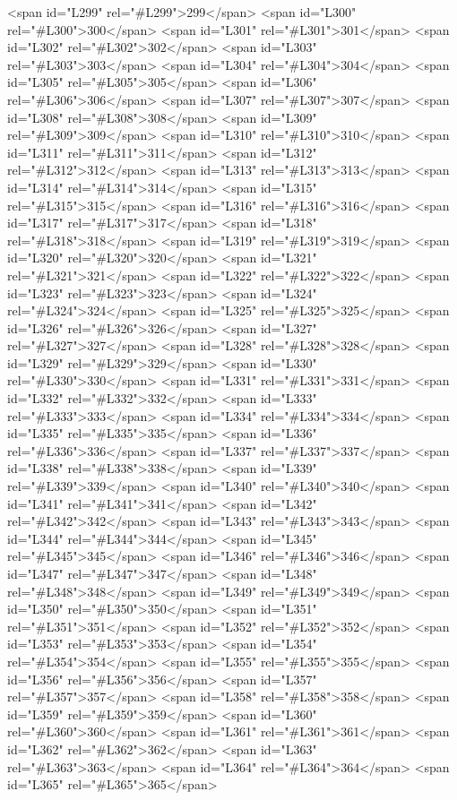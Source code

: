 <span id="L299" rel="#L299">299</span>
<span id="L300" rel="#L300">300</span>
<span id="L301" rel="#L301">301</span>
<span id="L302" rel="#L302">302</span>
<span id="L303" rel="#L303">303</span>
<span id="L304" rel="#L304">304</span>
<span id="L305" rel="#L305">305</span>
<span id="L306" rel="#L306">306</span>
<span id="L307" rel="#L307">307</span>
<span id="L308" rel="#L308">308</span>
<span id="L309" rel="#L309">309</span>
<span id="L310" rel="#L310">310</span>
<span id="L311" rel="#L311">311</span>
<span id="L312" rel="#L312">312</span>
<span id="L313" rel="#L313">313</span>
<span id="L314" rel="#L314">314</span>
<span id="L315" rel="#L315">315</span>
<span id="L316" rel="#L316">316</span>
<span id="L317" rel="#L317">317</span>
<span id="L318" rel="#L318">318</span>
<span id="L319" rel="#L319">319</span>
<span id="L320" rel="#L320">320</span>
<span id="L321" rel="#L321">321</span>
<span id="L322" rel="#L322">322</span>
<span id="L323" rel="#L323">323</span>
<span id="L324" rel="#L324">324</span>
<span id="L325" rel="#L325">325</span>
<span id="L326" rel="#L326">326</span>
<span id="L327" rel="#L327">327</span>
<span id="L328" rel="#L328">328</span>
<span id="L329" rel="#L329">329</span>
<span id="L330" rel="#L330">330</span>
<span id="L331" rel="#L331">331</span>
<span id="L332" rel="#L332">332</span>
<span id="L333" rel="#L333">333</span>
<span id="L334" rel="#L334">334</span>
<span id="L335" rel="#L335">335</span>
<span id="L336" rel="#L336">336</span>
<span id="L337" rel="#L337">337</span>
<span id="L338" rel="#L338">338</span>
<span id="L339" rel="#L339">339</span>
<span id="L340" rel="#L340">340</span>
<span id="L341" rel="#L341">341</span>
<span id="L342" rel="#L342">342</span>
<span id="L343" rel="#L343">343</span>
<span id="L344" rel="#L344">344</span>
<span id="L345" rel="#L345">345</span>
<span id="L346" rel="#L346">346</span>
<span id="L347" rel="#L347">347</span>
<span id="L348" rel="#L348">348</span>
<span id="L349" rel="#L349">349</span>
<span id="L350" rel="#L350">350</span>
<span id="L351" rel="#L351">351</span>
<span id="L352" rel="#L352">352</span>
<span id="L353" rel="#L353">353</span>
<span id="L354" rel="#L354">354</span>
<span id="L355" rel="#L355">355</span>
<span id="L356" rel="#L356">356</span>
<span id="L357" rel="#L357">357</span>
<span id="L358" rel="#L358">358</span>
<span id="L359" rel="#L359">359</span>
<span id="L360" rel="#L360">360</span>
<span id="L361" rel="#L361">361</span>
<span id="L362" rel="#L362">362</span>
<span id="L363" rel="#L363">363</span>
<span id="L364" rel="#L364">364</span>
<span id="L365" rel="#L365">365</span>
